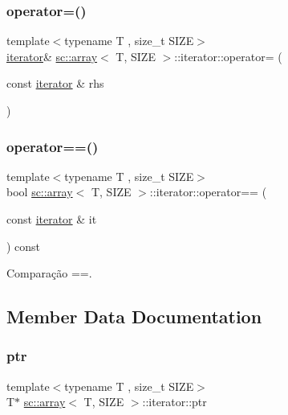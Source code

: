 \subsubsection{\texorpdfstring{operator=()}{operator=()}}
{\footnotesize\ttfamily template$<$typename T , size\+\_\+t S\+I\+ZE$>$ \\
\hyperlink{classsc_1_1array_1_1iterator}{iterator}\& \hyperlink{classsc_1_1array}{sc\+::array}$<$ T, S\+I\+ZE $>$\+::iterator\+::operator= (\begin{DoxyParamCaption}\item[{const \hyperlink{classsc_1_1array_1_1iterator}{iterator} \&}]{rhs }\end{DoxyParamCaption})\hspace{0.3cm}{\ttfamily [inline]}}

\mbox{\label{classsc_1_1array_1_1iterator_a7bd7f976868a154eb215f0c961444097}} 
\subsubsection{\texorpdfstring{operator==()}{operator==()}}
{\footnotesize\ttfamily template$<$typename T , size\+\_\+t S\+I\+ZE$>$ \\
bool \hyperlink{classsc_1_1array}{sc\+::array}$<$ T, S\+I\+ZE $>$\+::iterator\+::operator== (\begin{DoxyParamCaption}\item[{const \hyperlink{classsc_1_1array_1_1iterator}{iterator} \&}]{it }\end{DoxyParamCaption}) const\hspace{0.3cm}{\ttfamily [inline]}}



Comparação ==. 



\subsection{Member Data Documentation}
\mbox{\label{classsc_1_1array_1_1iterator_a759319abf650f16d89547f520f7bb5a6}} 
\subsubsection{\texorpdfstring{ptr}{ptr}}
{\footnotesize\ttfamily template$<$typename T , size\+\_\+t S\+I\+ZE$>$ \\
T$\ast$ \hyperlink{classsc_1_1array}{sc\+::array}$<$ T, S\+I\+ZE $>$\+::iterator\+::ptr\hspace{0.3cm}{\ttfamily [private]}}


